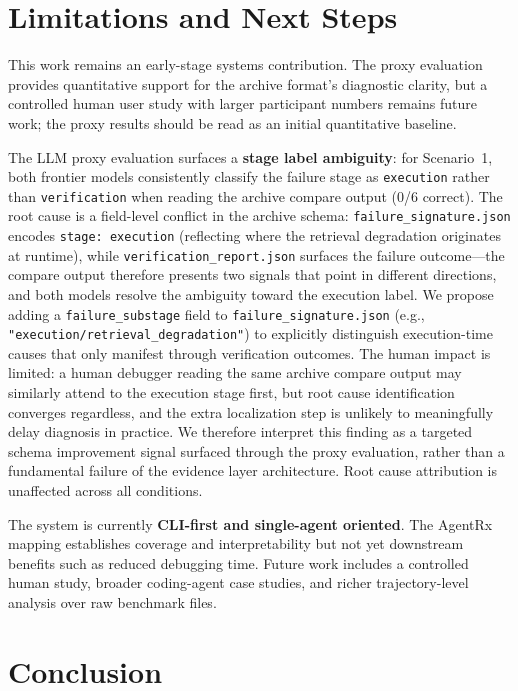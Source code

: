 \documentclass[11pt]{article}
\begin{document}
\section{Limitations and Next Steps}
\label{sec:limitations}

This work remains an early-stage systems contribution. The proxy evaluation provides quantitative support for the archive format's diagnostic clarity, but a controlled human user study with larger participant numbers remains future work; the proxy results should be read as an initial quantitative baseline.

The LLM proxy evaluation surfaces a \textbf{stage label ambiguity}: for Scenario~1, both frontier models consistently classify the failure stage as \texttt{execution} rather than \texttt{verification} when reading the archive compare output (0/6 correct). The root cause is a field-level conflict in the archive schema: \texttt{failure\_signature.json} encodes \texttt{stage:~execution} (reflecting where the retrieval degradation originates at runtime), while \texttt{verification\_report.json} surfaces the failure outcome---the compare output therefore presents two signals that point in different directions, and both models resolve the ambiguity toward the execution label. We propose adding a \texttt{failure\_substage} field to \texttt{failure\_signature.json} (e.g., \texttt{"execution/retrieval\_degradation"}) to explicitly distinguish execution-time causes that only manifest through verification outcomes. The human impact is limited: a human debugger reading the same archive compare output may similarly attend to the execution stage first, but root cause identification converges regardless, and the extra localization step is unlikely to meaningfully delay diagnosis in practice. We therefore interpret this finding as a targeted schema improvement signal surfaced through the proxy evaluation, rather than a fundamental failure of the evidence layer architecture. Root cause attribution is unaffected across all conditions.

The system is currently \textbf{CLI-first and single-agent oriented}. The AgentRx mapping establishes coverage and interpretability but not yet downstream benefits such as reduced debugging time. Future work includes a controlled human study, broader coding-agent case studies, and richer trajectory-level analysis over raw benchmark files.

\section{Conclusion}
\end{document}
